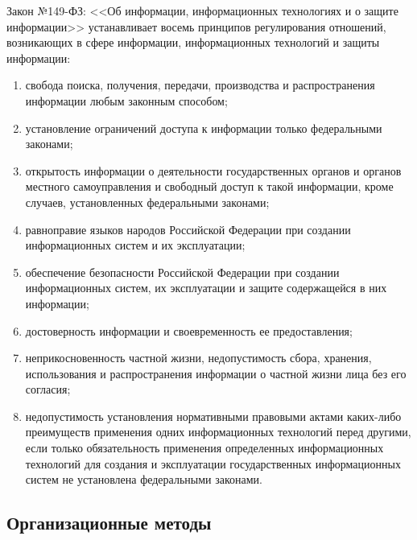 
Закон №149-ФЗ: <<Об информации, информационных технологиях и о защите информации>> устанавливает восемь принципов регулирования отношений, возникающих в сфере информации, информационных технологий и защиты информации:
\begin{enumerate}
    \item свобода поиска, получения, передачи, производства и распространения информации любым законным способом;
    \item установление ограничений доступа к информации только федеральными законами;
    \item открытость информации о деятельности государственных органов и органов местного самоуправления и свободный доступ к такой информации, кроме случаев, установленных федеральными законами;
    \item равноправие языков народов Российской Федерации при создании информационных систем и их эксплуатации;
    \item обеспечение безопасности Российской Федерации при создании информационных систем, их эксплуатации и защите содержащейся в них информации;
    \item достоверность информации и своевременность ее предоставления;
    \item неприкосновенность частной жизни, недопустимость сбора, хранения, использования и распространения информации о частной жизни лица без его согласия;
    \item недопустимость установления нормативными правовыми актами каких-либо преимуществ применения одних информационных технологий перед другими, если только обязательность применения определенных информационных технологий для создания и эксплуатации государственных информационных систем не установлена федеральными законами.
\end{enumerate}



\subsection{Организационные методы}


